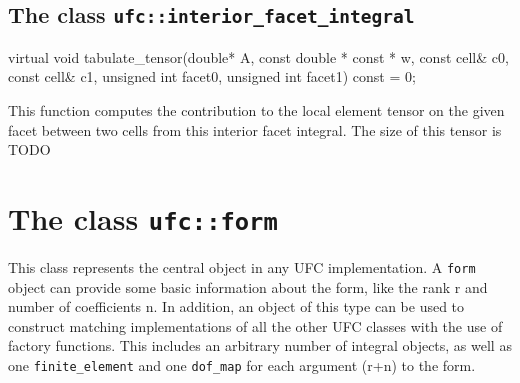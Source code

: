 




\subsection{The class \texttt{ufc::interior\_facet\_integral}}
\begin{code}
virtual void tabulate_tensor(double* A,
                             const double * const * w,
                             const cell& c0,
                             const cell& c1,
                             unsigned int facet0,
                             unsigned int facet1) const = 0;
\end{code}
This function computes the contribution to the local element tensor
on the given facet between two cells from this interior facet integral.
The size of this tensor is TODO


\section{The class \texttt{ufc::form}}

This class represents the central object in any UFC implementation.
A \texttt{form} object can provide some basic information about the form,
like the rank r and number of coefficients n.
In addition, an object of this type can be used to construct matching
implementations of all the other UFC classes with the use of factory functions.
This includes an arbitrary number of integral objects,
as well as one \texttt{finite\_element} and one \texttt{dof\_map} for
each argument (r+n) to the form.

